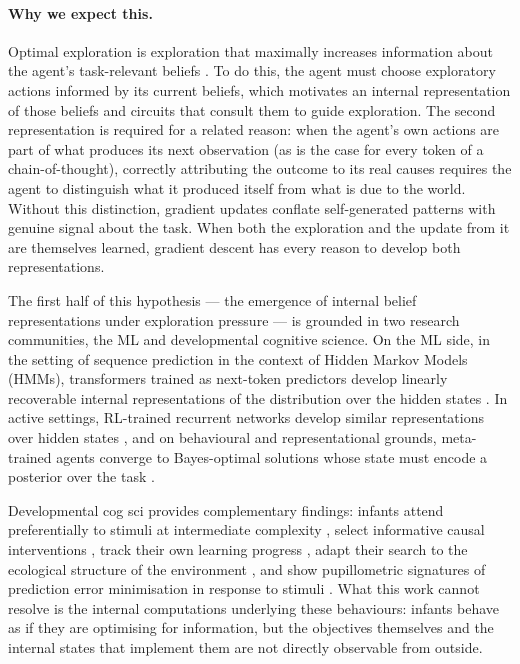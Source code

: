 \documentclass[11pt]{article}
\begin{document}
\paragraph{Why we expect this.} Optimal exploration is exploration that maximally increases information about the agent's task-relevant beliefs \citep{russo2014ids}. To do this, the agent must choose exploratory actions informed by its current beliefs, which motivates an internal representation of those beliefs and circuits that consult them to guide exploration. The second representation is required for a related reason: when the agent's own actions are part of what produces its next observation (as is the case for every token of a chain-of-thought), correctly attributing the outcome to its real causes requires the agent to distinguish what it produced itself from what is due to the world. Without this distinction, gradient updates conflate self-generated patterns with genuine signal about the task. When both the exploration and the update from it are themselves learned, gradient descent has every reason to develop both representations.

The first half of this hypothesis --- the emergence of internal belief representations under exploration pressure --- is grounded in two research communities, the ML and developmental cognitive science. On the ML side, in the setting of sequence prediction in the context of Hidden Markov Models (HMMs), transformers trained as next-token predictors develop linearly recoverable internal representations of the distribution over the hidden states \citep{shai2024belief}. In active settings, RL-trained recurrent networks develop similar representations over hidden states \citep{hennig2023emergence}, and on behavioural and representational grounds, meta-trained agents converge to Bayes-optimal solutions whose state must encode a posterior over the task \citep{mikulik2020bayesopt,ortega2019meta}.

Developmental cog sci provides complementary findings: infants attend preferentially to stimuli at intermediate complexity \citep[the Goldilocks effect,][]{kidd2012goldilocks}, select informative causal interventions \citep{lapidow2020informative}, track their own learning progress \citep{poli2020infants}, adapt their search to the ecological structure of the environment \citep{ruggeri2022ecological}, and show pupillometric signatures of prediction error minimisation in response to stimuli \citep{zhang2019prediction}. What this work cannot resolve is the internal computations underlying these behaviours: infants behave as if they are optimising for information, but the objectives themselves and the internal states that implement them are not directly observable from outside.
\end{document}
